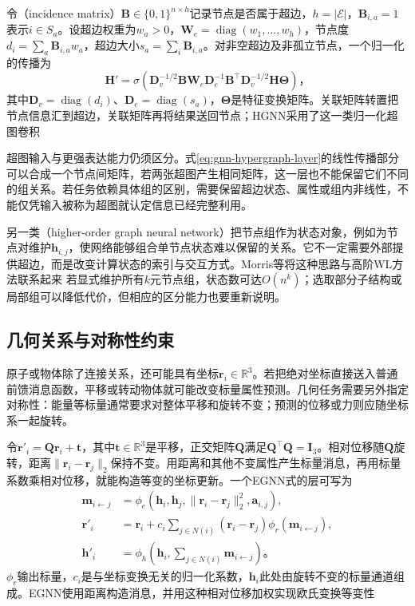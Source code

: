 令（incidence matrix）$\bm{B}\in\{0,1\}^{n\times h}$记录节点是否属于超边，$h=|\mathcal{E}|$，$\bm{B}_{i,a}=1$表示$i\in S_a$。设超边权重为$w_a>0$，$\bm{W}_e=\operatorname{diag}(w_1,\ldots,w_h)$，节点度$d_i=\sum_a\bm{B}_{i,a}w_a$，超边大小$s_a=\sum_i\bm{B}_{i,a}$。对非空超边及非孤立节点，一个归一化的传播为
\begin{equation}
  \bm{H}'=\sigma\!\left(
    \bm{D}_v^{-1/2}\bm{B}\bm{W}_e\bm{D}_e^{-1}
      \bm{B}^{\top}\bm{D}_v^{-1/2}\bm{H}\bm{\Theta}\right)\text{，}
  \label{eq:gnn-hypergraph-layer}
\end{equation}
其中$\bm{D}_v=\operatorname{diag}(d_i)$、$\bm{D}_e=\operatorname{diag}(s_a)$，$\bm{\Theta}$是特征变换矩阵。关联矩阵转置把节点信息汇到超边，关联矩阵再将结果送回节点；HGNN采用了这一类归一化超图卷积

超图输入与更强表达能力仍须区分。式\eqref{eq:gnn-hypergraph-layer}的线性传播部分可以合成一个节点间矩阵，若两张超图产生相同矩阵，这一层也不能保留它们不同的组关系。若任务依赖具体组的区别，需要保留超边状态、属性或组内非线性，不能仅凭输入被称为超图就认定信息已经完整利用。

另一类（higher-order graph neural network）把节点组作为状态对象，例如为节点对维护$\bm{h}_{i,j}$，使网络能够组合单节点状态难以保留的关系。它不一定需要外部提供超边，而是改变计算状态的索引与交互方式。Morris等将这种思路与高阶WL方法联系起来 若显式维护所有$k$元节点组，状态数可达$O(n^k)$；选取部分子结构或局部组可以降低代价，但相应的区分能力也要重新说明。

\subsection{几何关系与对称性约束}
\label{sec:gnn-geometric}

原子或物体除了连接关系，还可能具有坐标$\bm{r}_i\in\mathbb{R}^{3}$。若把绝对坐标直接送入普通前馈消息函数，平移或转动物体就可能改变标量属性预测。几何任务需要另外指定对称性：能量等标量通常要求对整体平移和旋转不变；预测的位移或力则应随坐标系一起旋转。

令$\bm{r}'_i=\bm{Q}\bm{r}_i+\bm{t}$，其中$\bm{t}\in\mathbb{R}^{3}$是平移，正交矩阵$\bm{Q}$满足$\bm{Q}^{\top}\bm{Q}=\bm{I}_3$。相对位移随$\bm{Q}$旋转，距离$\lVert\bm{r}_i-\bm{r}_j\rVert_2$保持不变。用距离和其他不变属性产生标量消息，再用标量系数乘相对位移，就能构造等变的坐标更新。一个EGNN式的层可写为
\begin{equation}
  \begin{aligned}
    \bm{m}_{i\leftarrow j}
      &=\phi_e(\bm{h}_i,\bm{h}_j,
        \lVert\bm{r}_i-\bm{r}_j\rVert_2^2,\bm{a}_{i,j}),\\
    \bm{r}'_i&=\bm{r}_i+
      c_i\sum_{j\in N(i)}(\bm{r}_i-\bm{r}_j)\phi_r(\bm{m}_{i\leftarrow j}),\\
    \bm{h}'_i&=\phi_h\!\left(\bm{h}_i,\sum_{j\in N(i)}\bm{m}_{i\leftarrow j}\right)\text{。}
  \end{aligned}
  \label{eq:gnn-egnn}
\end{equation}
$\phi_r$输出标量，$c_i$是与坐标变换无关的归一化系数，$\bm{h}_i$此处由旋转不变的标量通道组成。EGNN使用距离构造消息，并用这种相对位移加权实现欧氏变换等变性


